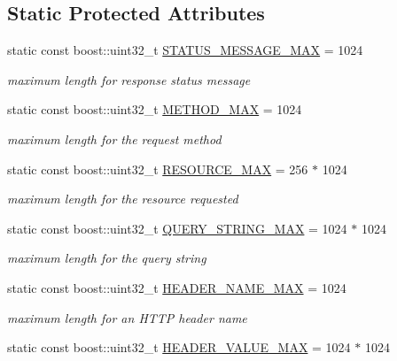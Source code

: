 \subsection*{Static Protected Attributes}
\begin{DoxyCompactItemize}
\item 
static const boost\-::uint32\-\_\-t \hyperlink{classpion_1_1http_1_1parser_a5480070912368dd015d72d54fcbece66}{S\-T\-A\-T\-U\-S\-\_\-\-M\-E\-S\-S\-A\-G\-E\-\_\-\-M\-A\-X} = 1024
\begin{DoxyCompactList}\small\item\em maximum length for response status message \end{DoxyCompactList}\item 
static const boost\-::uint32\-\_\-t \hyperlink{classpion_1_1http_1_1parser_ad781cc2dcdb333a8d286a4534d4509cb}{M\-E\-T\-H\-O\-D\-\_\-\-M\-A\-X} = 1024
\begin{DoxyCompactList}\small\item\em maximum length for the request method \end{DoxyCompactList}\item 
static const boost\-::uint32\-\_\-t \hyperlink{classpion_1_1http_1_1parser_adf1d822b13731ee6430d5cfd8ad78a95}{R\-E\-S\-O\-U\-R\-C\-E\-\_\-\-M\-A\-X} = 256 $\ast$ 1024
\begin{DoxyCompactList}\small\item\em maximum length for the resource requested \end{DoxyCompactList}\item 
static const boost\-::uint32\-\_\-t \hyperlink{classpion_1_1http_1_1parser_a2ef9e2d01055c727c40cd6af47cbfd2a}{Q\-U\-E\-R\-Y\-\_\-\-S\-T\-R\-I\-N\-G\-\_\-\-M\-A\-X} = 1024 $\ast$ 1024
\begin{DoxyCompactList}\small\item\em maximum length for the query string \end{DoxyCompactList}\item 
static const boost\-::uint32\-\_\-t \hyperlink{classpion_1_1http_1_1parser_aa0d75346e6643078bb48efe9c382497d}{H\-E\-A\-D\-E\-R\-\_\-\-N\-A\-M\-E\-\_\-\-M\-A\-X} = 1024
\begin{DoxyCompactList}\small\item\em maximum length for an H\-T\-T\-P header name \end{DoxyCompactList}\item 
static const boost\-::uint32\-\_\-t \hyperlink{classpion_1_1http_1_1parser_a803490d20fadf6ee1253dd9d62844dd8}{H\-E\-A\-D\-E\-R\-\_\-\-V\-A\-L\-U\-E\-\_\-\-M\-A\-X} = 1024 $\ast$ 1024

\end{DoxyCompactItemize}
